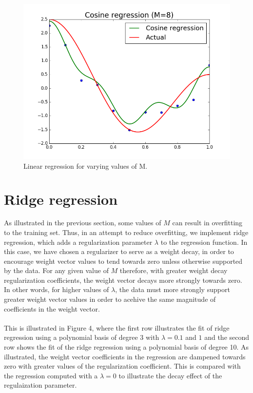 \documentclass{article}
\begin{document}
\begin{figure}[width=\linewidth]
\begin{multicols}{2}
  \includegraphics[width=1.2\linewidth]{code/P2/cosine_regression,8.png}
\end{multicols}
\caption{Linear regression for varying values of M.}
\end{figure}
\vspace{3mm}

\section{Ridge regression}

As illustrated in the previous section, some values of $M$ can result in overfitting to the training set. Thus, in an attempt to reduce overfitting, we implement ridge regression, which adds a regularization parameter $\lambda$ to the regression function. In this case, we have chosen a regularizer to serve as a weight decay, in order to encourage weight vector values to tend towards zero unless otherwise supported by the data. For any given value of $M$ therefore, with greater weight decay regularization coefficients, the weight vector decays more strongly towards zero. In other words, for higher values of $\lambda$, the data must more strongly support greater weight vector values in order to acehive the same magnitude of coefficients in the weight vector. \\ \\
This is illustrated in Figure 4, where the first row illustrates the fit of ridge regression using a polynomial basis of degree 3 with $\lambda = 0.1$ and $1$ and the second row shows the fit of the ridge regression using a polynomial basis of degree 10. As illustrated, the weight vector coefficients in the regression are dampened towards zero with greater values of the regularization coefficient. This is compared with the regression computed with a $\lambda = 0$ to illustrate the decay effect of the regulaization parameter. \\ \\
\end{document}
